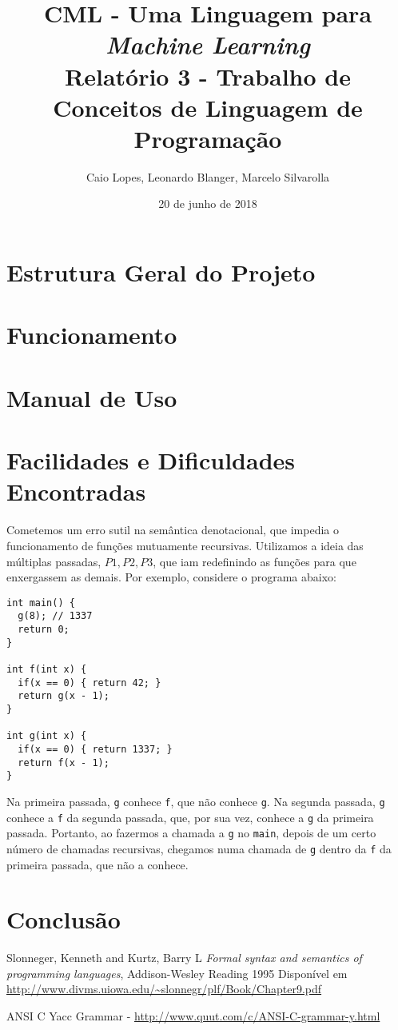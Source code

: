 \documentclass[12pt]{article}
\title{CML - Uma Linguagem para {\it Machine Learning} \\ \Large Relatório 3 - Trabalho de Conceitos de Linguagem de Programação}
\author{Caio Lopes, Leonardo Blanger, Marcelo Silvarolla}
\date{20 de junho de 2018}
\begin{document}
\lstset{
  basicstyle=\ttfamily,
  columns=fullflexible,
  keepspaces=true,
  mathescape
}

\maketitle
\tableofcontents
\newpage
\section{Estrutura Geral do Projeto}

\section{Funcionamento}

\section{Manual de Uso}

\section{Facilidades e Dificuldades Encontradas}
Cometemos um erro sutil na semântica denotacional, que impedia o funcionamento de funções mutuamente recursivas. Utilizamos a ideia das múltiplas passadas, $P1, P2, P3$, que iam redefinindo as funções para que enxergassem as demais. Por exemplo, considere o programa abaixo:

\begin{verbatim}
int main() {
  g(8); // 1337
  return 0;
}

int f(int x) {
  if(x == 0) { return 42; }
  return g(x - 1);
}

int g(int x) {
  if(x == 0) { return 1337; }
  return f(x - 1);
}

\end{verbatim}

Na primeira passada, \texttt{g} conhece \texttt{f}, que não conhece \texttt{g}.
Na segunda passada, \texttt{g} conhece a \texttt{f} da segunda passada, que, por sua vez, conhece a \texttt{g} da primeira passada. Portanto, ao fazermos a chamada a \texttt{g} no \texttt{main}, depois de um certo número de chamadas recursivas, chegamos numa chamada de \texttt{g} dentro da \texttt{f} da primeira passada, que não a conhece.

\section{Conclusão}

\begin{thebibliography}{9}
  Slonneger, Kenneth and Kurtz, Barry L
  \textit{Formal syntax and semantics of programming languages},
  Addison-Wesley Reading
  1995
  Disponível em \url{http://www.divms.uiowa.edu/~slonnegr/plf/Book/Chapter9.pdf}

\item ANSI C Yacc Grammar - \url{http://www.quut.com/c/ANSI-C-grammar-y.html}
\end{thebibliography}
	
\end{document}
